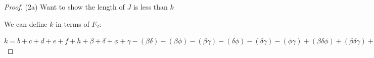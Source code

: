 \documentclass[manuscript]{acmart}
\begin{document}
\begin{proof}











        





        (2a) Want to show the length of $J$ is less than $k$
        
        We can define $k$ in terms of $F_2$:

        $k = b + c + d + e + f + h
        + \beta + \delta + \phi + \gamma
        - (\beta \delta) - (\beta \phi) - (\beta \gamma) - (\delta \phi) - (\delta \gamma) - (\phi \gamma)
        + (\beta \delta \phi) + (\beta \delta \gamma) + (\beta \phi \gamma) + (\delta \phi \gamma)
        - (\beta \delta \phi \gamma)
        + 1
        $


\end{proof}
\end{document}
